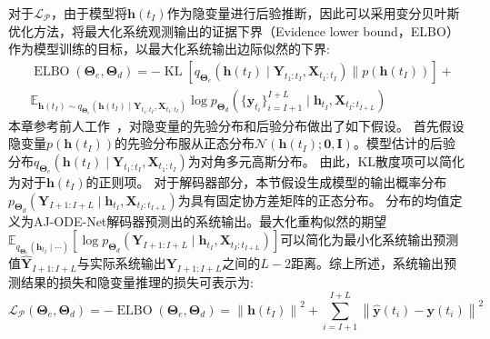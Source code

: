对于$\mathcal{L_P}$，由于模型将$\boldsymbol h(t_I)$作为隐变量进行后验推断，因此可以采用变分贝叶斯优化方法，将最大化系统观测输出的证据下界（Evidence lower bound，ELBO）作为模型训练的目标，以最大化系统输出边际似然的下界\cite{10.5555/3454287.3454765}:
\begin{equation}
\begin{aligned}
&\operatorname{ELBO}(\boldsymbol{\Theta}_e,\boldsymbol{\Theta}_d)=-\operatorname{KL}\left[q_{\boldsymbol \Theta_e}(\boldsymbol h({t_I}) \mid\boldsymbol{Y}_{t_{1}: t_{I}}, \boldsymbol{X}_{t_{1}: t_{I}}) \| p\left(\boldsymbol h({t_I})\right)\right]+\\&\mathbb{E}_{\boldsymbol h({t_I}) \sim q_{\boldsymbol \Theta_e}(\boldsymbol h({t_I}) \mid\boldsymbol{Y}_{t_{1}: t_{I}}, \boldsymbol{X}_{t_{1}: t_{I}})}\log p_{\boldsymbol \Theta_d}(\{\boldsymbol y_{t_i}\}_{i=I+1}^{I+L}\mid \boldsymbol h_{t_I},\boldsymbol X_{t_I:t_{I+L}})
\end{aligned}
\end{equation}
本章参考前人工作~\cite{chen2018neural, 10.5555/3454287.3454765, Yildiz2019}，对隐变量的先验分布和后验分布做出了如下假设。
首先假设隐变量$p(\boldsymbol{h}(t_I))$的先验分布服从正态分布$\mathcal{N}(\boldsymbol{h}(t_I);\boldsymbol 0, \boldsymbol I)$。模型估计的后验分布$q_{\boldsymbol \Theta_e}(\boldsymbol h({t_I}) \mid\boldsymbol{Y}_{t_{1}: t_{I}}, \boldsymbol{X}_{t_{1}: t_{I}})$为对角多元高斯分布。
由此，KL散度项可以简化为对于$\boldsymbol h(t_I)$的正则项。
对于解码器部分，本节假设生成模型的输出概率分布$p_{\boldsymbol \Theta_d}({\boldsymbol Y}_{I+1: I+L}\mid \boldsymbol h_{t_I},\boldsymbol X_{t_I:t_{I+L}})$为具有固定协方差矩阵的正态分布。
分布的均值定义为AJ-ODE-Net解码器预测出的系统输出。最大化重构似然的期望$\mathbb{E}_{q_{\boldsymbol \Theta_e}(\boldsymbol h_{t_I} \mid\cdots)}\left[\log p_{\boldsymbol \Theta_d}({\boldsymbol Y}_{I+1: I+L}\mid \boldsymbol h_{t_I},\boldsymbol X_{t_I:t_{I+L}})\right]$可以简化为最小化系统输出预测值$\hat{\boldsymbol Y}_{I+1: I+L}$与实际系统输出${\boldsymbol Y}_{I+1: I+L}$之间的$L-2$距离。综上所述，系统输出预测结果的损失和隐变量推理的损失可表示为:
\begin{equation}
\mathcal{L}_{\mathcal{P}}\left(\boldsymbol{\Theta}_{e}, \boldsymbol{\Theta}_{d}\right) =-\operatorname{ELBO}\left(\boldsymbol{\Theta}_{e}, \boldsymbol{\Theta}_{d}\right)
=\left\|\boldsymbol{h}\left(t_{I}\right)\right\|^{2}+\sum_{i=I+1}^{I+L}\left\|\hat{\boldsymbol{y}}\left(t_{i}\right)-\boldsymbol{y}\left(t_{i}\right)\right\|^{2}
\end{equation}

